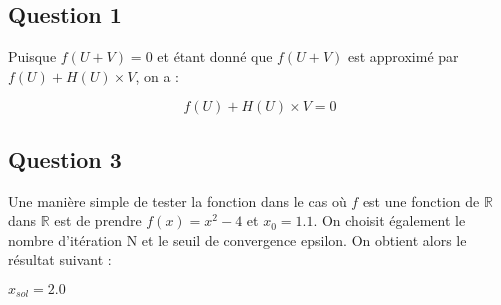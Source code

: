 \subsection {Question 1} 
Puisque $f(U+V)=0$ et étant donné que $f(U+V)$ est approximé par $f(U)+H(U) \times V$, on a :

\begin{equation}
  f(U)+H(U) \times V=0
\end{equation}

\subsection{Question 3}

Une manière simple de tester la fonction dans le cas où $f$ est une fonction de $\mathbb{R}$ dans $\mathbb{R}$ est de prendre $f(x)=x^2-4$ et $x_0=1.1$. On choisit également le nombre d'itération N et le seuil de convergence epsilon. On obtient alors le résultat suivant :

$x_{sol}=2.0$

